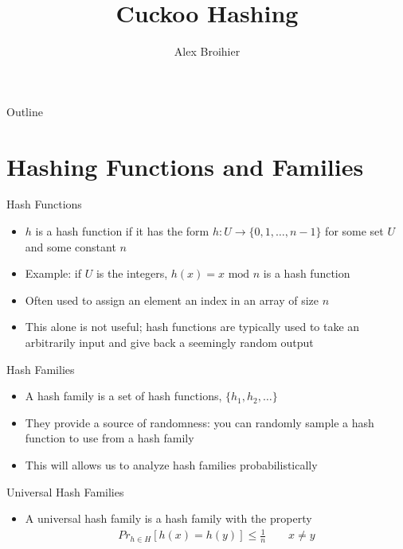 \documentclass[aspectratio=169]{beamer}
\title{Cuckoo Hashing}
\author{Alex Broihier}
\date{}
\begin{document}

\begin{frame}
\titlepage
\end{frame}

\begin{frame}{Outline}
  \tableofcontents
\end{frame}

\section{Hashing Functions and Families}
\frame{\sectionpage}

\begin{frame}{Hash Functions}
    \begin{itemize}
        \item $h$ is a hash function if it has the form $h: U \to \{0, 1, \ldots, n - 1\}$ for some set $U$ and some constant $n$
        \item Example: if $U$ is the integers, $h(x) = x \text{ mod } n$ is a hash function \pause
        \item Often used to assign an element an index in an array of size $n$
        \item This alone is not useful; hash functions are typically used to take an arbitrarily input and give back a seemingly random output
    \end{itemize}
\end{frame}

\begin{frame}{Hash Families}
    \begin{itemize}
        \item A hash family is a set of hash functions, $\{h_1, h_2, \ldots\}$
        \item They provide a source of randomness: you can randomly sample a hash function to use from a hash family \pause
        \item This will allows us to analyze hash families probabilistically
    \end{itemize}
\end{frame}

\begin{frame}{Universal Hash Families}
    \begin{itemize}
        \item A universal hash family is a hash family with the property
        \begin{align*}
            Pr_{h \in H}[h(x) = h(y)] \le \frac 1 n \quad\quad x \ne y
        \end{align*}
    \end{itemize}
    \nocite{overview}
    \nocite{site:jeff}
\end{frame}
\end{document}
